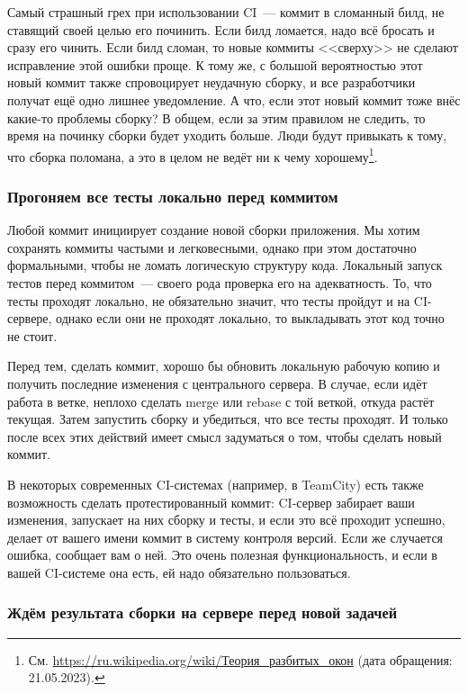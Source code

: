 \documentclass{../../text-style}
\begin{document}
Самый страшный грех при использовании CI~--- коммит в сломанный билд, не ставящий своей целью его починить. Если билд ломается, надо всё бросать и сразу его чинить. Если билд сломан, то новые коммиты <<сверху>> не сделают исправление этой ошибки проще. К тому же, с большой вероятностью этот новый коммит также спровоцирует неудачную сборку, и все разработчики получат ещё одно лишнее уведомление. А что, если этот новый коммит тоже внёс какие-то проблемы сборку? В общем, если за этим правилом не следить, то время на починку сборки будет уходить больше. Люди будут привыкать к тому, что сборка поломана, а это в целом не ведёт ни к чему хорошему\footnote{См. \url{https://ru.wikipedia.org/wiki/Теория_разбитых_окон} (дата обращения: 21.05.2023).}.

\subsubsection{Прогоняем все тесты локально перед коммитом}

Любой коммит инициирует создание новой сборки приложения. Мы хотим сохранять коммиты частыми и легковесными, однако при этом достаточно формальными, чтобы не ломать логическую структуру кода. Локальный запуск тестов перед коммитом~--- своего рода проверка его на адекватность. То, что тесты проходят локально, не обязательно значит, что тесты пройдут и на CI-сервере, однако если они не проходят локально, то выкладывать этот код точно не стоит.

Перед тем, сделать коммит, хорошо бы обновить локальную рабочую копию и получить последние изменения с центрального сервера. В случае, если идёт работа в ветке, неплохо сделать merge или rebase с той веткой, откуда растёт текущая. Затем запустить сборку и убедиться, что все тесты проходят. И только после всех этих действий имеет смысл задуматься о том, чтобы сделать новый коммит.

В некоторых современных CI-системах (например, в TeamCity) есть также возможность сделать протестированный коммит: CI-сервер забирает ваши изменения, запускает на них сборку и тесты, и если это всё проходит успешно, делает от вашего имени коммит в систему контроля версий. Если же случается ошибка, сообщает вам о ней. Это очень полезная функциональность, и если в вашей CI-системе она есть, ей надо обязательно пользоваться.

\subsubsection{Ждём результата сборки на сервере перед новой задачей}
\end{document}
